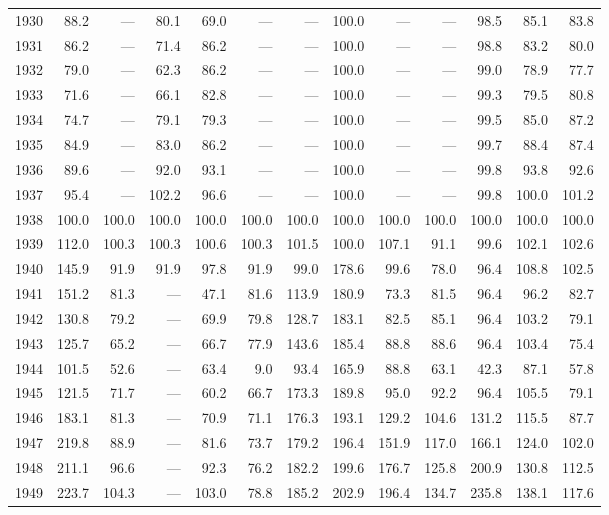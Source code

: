 \begin{longtable}{rrrrrrrrrrrrr}
1930 & 88.2 & --- & 80.1 & 69.0 & --- & --- & 100.0 & --- & --- & 98.5 & 85.1 & 83.8 \\
1931 & 86.2 & --- & 71.4 & 86.2 & --- & --- & 100.0 & --- & --- & 98.8 & 83.2 & 80.0 \\
1932 & 79.0 & --- & 62.3 & 86.2 & --- & --- & 100.0 & --- & --- & 99.0 & 78.9 & 77.7 \\
1933 & 71.6 & --- & 66.1 & 82.8 & --- & --- & 100.0 & --- & --- & 99.3 & 79.5 & 80.8 \\
1934 & 74.7 & --- & 79.1 & 79.3 & --- & --- & 100.0 & --- & --- & 99.5 & 85.0 & 87.2 \\
1935 & 84.9 & --- & 83.0 & 86.2 & --- & --- & 100.0 & --- & --- & 99.7 & 88.4 & 87.4 \\
1936 & 89.6 & --- & 92.0 & 93.1 & --- & --- & 100.0 & --- & --- & 99.8 & 93.8 & 92.6 \\
1937 & 95.4 & --- & 102.2 & 96.6 & --- & --- & 100.0 & --- & --- & 99.8 & 100.0 & 101.2 \\
1938 & 100.0 & 100.0 & 100.0 & 100.0 & 100.0 & 100.0 & 100.0 & 100.0 & 100.0 & 100.0 & 100.0 & 100.0 \\
1939 & 112.0 & 100.3 & 100.3 & 100.6 & 100.3 & 101.5 & 100.0 & 107.1 & 91.1 & 99.6 & 102.1 & 102.6 \\
1940 & 145.9 & 91.9 & 91.9 & 97.8 & 91.9 & 99.0 & 178.6 & 99.6 & 78.0 & 96.4 & 108.8 & 102.5 \\
1941 & 151.2 & 81.3 & --- & 47.1 & 81.6 & 113.9 & 180.9 & 73.3 & 81.5 & 96.4 & 96.2 & 82.7 \\
1942 & 130.8 & 79.2 & --- & 69.9 & 79.8 & 128.7 & 183.1 & 82.5 & 85.1 & 96.4 & 103.2 & 79.1 \\
1943 & 125.7 & 65.2 & --- & 66.7 & 77.9 & 143.6 & 185.4 & 88.8 & 88.6 & 96.4 & 103.4 & 75.4 \\
1944 & 101.5 & 52.6 & --- & 63.4 & 9.0 & 93.4 & 165.9 & 88.8 & 63.1 & 42.3 & 87.1 & 57.8 \\
1945 & 121.5 & 71.7 & --- & 60.2 & 66.7 & 173.3 & 189.8 & 95.0 & 92.2 & 96.4 & 105.5 & 79.1 \\
1946 & 183.1 & 81.3 & --- & 70.9 & 71.1 & 176.3 & 193.1 & 129.2 & 104.6 & 131.2 & 115.5 & 87.7 \\
1947 & 219.8 & 88.9 & --- & 81.6 & 73.7 & 179.2 & 196.4 & 151.9 & 117.0 & 166.1 & 124.0 & 102.0 \\
1948 & 211.1 & 96.6 & --- & 92.3 & 76.2 & 182.2 & 199.6 & 176.7 & 125.8 & 200.9 & 130.8 & 112.5 \\
1949 & 223.7 & 104.3 & --- & 103.0 & 78.8 & 185.2 & 202.9 & 196.4 & 134.7 & 235.8 & 138.1 & 117.6 \\

\end{longtable}

